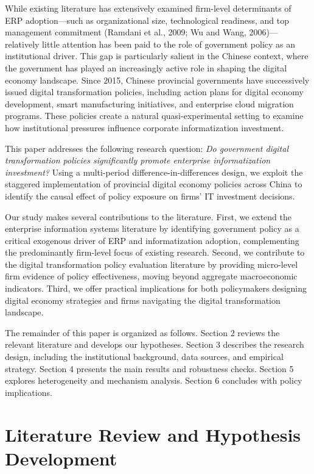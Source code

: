 \documentclass[12pt]{article}
\begin{document}
While existing literature has extensively examined firm-level determinants of ERP adoption—such as organizational size, technological readiness, and top management commitment (Ramdani et al., 2009; Wu and Wang, 2006)—relatively little attention has been paid to the role of government policy as an institutional driver. This gap is particularly salient in the Chinese context, where the government has played an increasingly active role in shaping the digital economy landscape. Since 2015, Chinese provincial governments have successively issued digital transformation policies, including action plans for digital economy development, smart manufacturing initiatives, and enterprise cloud migration programs. These policies create a natural quasi-experimental setting to examine how institutional pressures influence corporate informatization investment.

This paper addresses the following research question: \textit{Do government digital transformation policies significantly promote enterprise informatization investment?} Using a multi-period difference-in-differences design, we exploit the staggered implementation of provincial digital economy policies across China to identify the causal effect of policy exposure on firms' IT investment decisions.

Our study makes several contributions to the literature. First, we extend the enterprise information systems literature by identifying government policy as a critical exogenous driver of ERP and informatization adoption, complementing the predominantly firm-level focus of existing research. Second, we contribute to the digital transformation policy evaluation literature by providing micro-level firm evidence of policy effectiveness, moving beyond aggregate macroeconomic indicators. Third, we offer practical implications for both policymakers designing digital economy strategies and firms navigating the digital transformation landscape.

The remainder of this paper is organized as follows. Section 2 reviews the relevant literature and develops our hypotheses. Section 3 describes the research design, including the institutional background, data sources, and empirical strategy. Section 4 presents the main results and robustness checks. Section 5 explores heterogeneity and mechanism analysis. Section 6 concludes with policy implications.

\section{Literature Review and Hypothesis Development}
\end{document}
